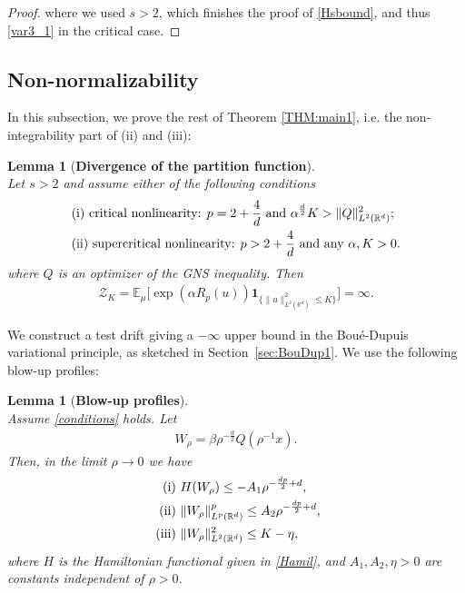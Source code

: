 \documentclass[%
11pt,  reqno]{amsart}
\newtheorem{lemma}[theorem]{Lemma}
\theoremstyle{remarkstyle}
\newcommand{\1}{\hspace{0.2mm}\text{I}\hspace{0.2mm}}
\newcommand{\noi}{\noindent}
\newcommand{\R}{\mathbb{R}}
\newcommand{\E}{\mathbb{E}}
\newcommand{\al}{\alpha}
\newcommand{\be}{\beta}
\newcommand{\ind}{\mathbf 1}
\numberwithin{equation}{section}
\numberwithin{theorem}{section}
\begin{document}
\begin{proof}
		\noi
		where we used $s > 2$,
		which finishes the proof of \eqref{Hsbound},
		and thus \eqref{var3_1} in the critical case.
	\end{proof}
	
	\medskip
	
	\subsection{Non-normalizability}
	\label{SEC:non2}
	In this subsection,
	we prove the rest of Theorem \ref{THM:main1},
	i.e. the non-integrability part of (ii) and (iii): 
	\begin{lemma}[\textbf{Divergence of the partition function}]\label{lem:blow super}\mbox{}\\
		Let $s>2$ and assume either of the following conditions
		\begin{align}
			\begin{split}
				&\textup{(i) critical nonlinearity: } p = 2+\frac4d \text{ and } \al^{\frac{d}2} K > \| Q\|^2_{L^2(\R^d)};\\
				&\textup{(ii) supercritical nonlinearity: } p > 2+\frac4d \text{ and any } \al, K > 0.
			\end{split}
			\label{conditions}
		\end{align}
		where $Q$ is an optimizer of the GNS inequality. Then
		\begin{align}
			\label{part}
			\mathcal Z_{K} =\E_{\mu}
			\Big[\exp(\al {R_p(u)})
			\ind_{\{\|u\|^2_{L^2(\R^d)}\le K\}}\Big] = \infty.
		\end{align}
	\end{lemma}
	
	We construct a test drift giving a $-\infty$ upper bound in the Bou\'e-Dupuis variational principle, as sketched in Section~\ref{sec:BouDup1}. We use the following blow-up profiles:
	
	\begin{lemma}[\textbf{Blow-up profiles}]
		\label{LEM:soliton2}\mbox{}\\
		Assume \eqref{conditions} holds. Let 
		\begin{align}
			\label{W}
			W_\rho = \be \rho^{-\frac{d}2} Q(\rho^{-1} x).
		\end{align}
		Then, in the limit $\rho \to 0$ we have
		\begin{align}
			\label{soliton}
			\begin{split}
				\textup{ (i) } & H (W_\rho)  \le - A_1 \rho^{-\frac{dp}2 +d},\\
				\textup{ (ii) } &\| W_\rho\|_{L^p (\R^d)}^p \le A_2 \rho^{-\frac{dp}2 +d},\\
				\textup{ (iii) } &\| W_\rho \|^2_{L^2(\R^d)} \le K - \eta,
			\end{split}
		\end{align} 
		\noindent where $H$ is the Hamiltonian functional given in \eqref{Hamil}, and $A_1, A_2, \eta > 0$ are constants independent of $\rho > 0$.
	\end{lemma}
	
\end{document}
